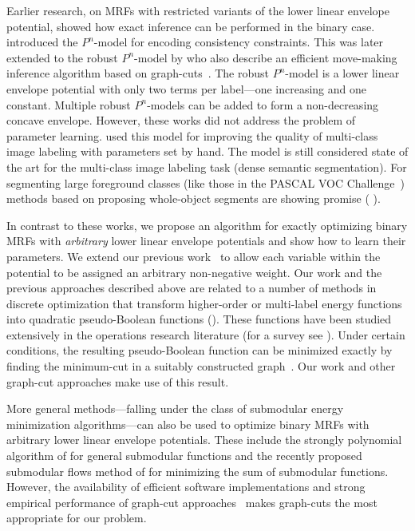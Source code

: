 \documentclass[10pt,journal,letterpaper,compsoc]{IEEEtran}
\renewcommand{\citename}{\citet}
\renewcommand{\cite}{\citep}
\begin{document}
Earlier research, on MRFs with restricted variants of the lower linear
envelope potential, showed how exact inference can be performed in the
binary case. \citename{Kohli:CVPR07} introduced the $P^n$-model for
encoding consistency constraints. This was later extended to the
robust $P^n$-model by \citename{Kohli:TR08} who also describe an
efficient move-making inference algorithm based on
graph-cuts~\cite{Boykov:ICCV99, Boykov:PAMI04}. The robust $P^n$-model
is a lower linear envelope potential with only two terms per
label---one increasing and one constant. Multiple robust $P^n$-models
can be added to form a non-decreasing concave envelope. However, these
works did not address the problem of parameter
learning. \citename{Ladicky:ICCV09} used this model for improving the
quality of multi-class image labeling with parameters set by hand. The
model is still considered state of the art for the multi-class image
labeling task (\ie dense semantic segmentation). For segmenting large
foreground classes (like those in the PASCAL VOC
Challenge~\cite{PASCAL:VOC:2012}) methods based on proposing
whole-object segments are showing promise (\eg
\cite{Carreira:ECCV12}).

In contrast to these works, we propose an algorithm for exactly
optimizing binary MRFs with \emph{arbitrary} lower linear envelope
potentials and show how to learn their parameters. We extend our
previous work~\cite{Gould:ICML2011} to allow each variable within the
potential to be assigned an arbitrary non-negative weight. Our work
and the previous approaches described above are related to a number of
methods in discrete optimization that transform higher-order or
multi-label energy functions into quadratic pseudo-Boolean functions
(\eg \cite{Ishikawa:PAMI03, Ishikawa:CVPR09, Rother:CVPR09}). These
functions have been studied extensively in the operations research
literature (for a survey see \citename{Boros:MATH02}). Under certain
conditions, the resulting pseudo-Boolean function can be minimized
exactly by finding the minimum-cut in a suitably constructed
graph~\cite{Hammer:1965, Freedman:CVPR05}. Our work and other
graph-cut approaches make use of this result.

More general methods---falling under the class of submodular energy
minimization algorithms---can also be used to optimize binary MRFs
with arbitrary lower linear envelope potentials. These include the
strongly polynomial algorithm of \citename{Orlin:MP2009} for general
submodular functions and the recently proposed submodular flows method
of \citename{Kolmogorov:DAM12} for minimizing the sum of submodular
functions. However, the availability of efficient software
implementations and strong empirical performance of graph-cut
approaches~\cite{Boykov:PAMI04} makes graph-cuts the most appropriate
for our problem.
\end{document}
